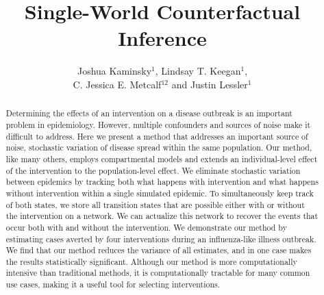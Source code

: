 \documentclass[PTRSB]{rsos}
\title{Single-World Counterfactual Inference}
\author{%
Joshua Kaminsky$^{1}$, Lindsay T.
Keegan$^{1}$,\\C.
Jessica E.
Metcalf$^{12}$ and Justin Lessler$^{1}$}
\begin{document}
\begin{abstract} %
  Determining the effects of an intervention on a disease outbreak is an important problem in epidemiology. %
  However, multiple confounders and sources of noise make it difficult to address. %
  Here we present a method that addresses an important source of noise, stochastic variation of disease spread within the same population. %
  Our method, like many others, employs compartmental models and extends an individual-level effect of the intervention to the population-level effect. %
  We eliminate stochastic variation between epidemics by tracking both what happens with intervention and what happens without intervention within a single simulated epidemic. %
  To simultaneously keep track of both states, we store all transition states that are possible either with or without the intervention on a network. %
  We can actualize this network to recover the events that occur both with and without the intervention. %
  We demonstrate our method by estimating cases averted by four interventions during an influenza-like illness outbreak. %
  We find that our method reduces the variance of all estimates, and in one case makes the results statistically significant. %
  Although our method is more computationally intensive than traditional methods, it is computationally tractable for many common use cases, making it a useful tool for selecting interventions. %
\end{abstract}



\maketitle
\end{document}
